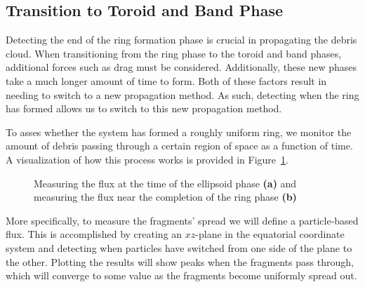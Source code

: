 \documentclass[a4paper, 12pt]{article}
\begin{document}
\subsection{Transition to Toroid and Band Phase}

Detecting the end of the ring formation phase is crucial in propagating the debris cloud. When transitioning from the ring phase to the toroid and band phases, additional forces such as drag must be considered. Additionally, these new phases take a much longer amount of time to form. Both of these factors result in needing to switch to a new propagation method. As such, detecting when the ring has formed allows us to switch to this new propagation method.

To asses whether the system has formed a roughly uniform ring, we monitor the amount of debris passing through a certain region of space as a function of time. A visualization of how this process works is provided in Figure~\ref{flux_diagrams}.

\begin{figure}[h]
	\begin{adjustbox}{max width=1\linewidth,center}
		\centering     %
	\end{adjustbox}
	\caption{Measuring the flux at the time of the ellipsoid phase \textbf{(a)} and measuring the flux near the completion of the ring phase \textbf{(b)} }
	\label{flux_diagrams}
\end{figure}

More specifically, to measure the fragments' spread we will define a particle-based flux. This is accomplished by creating an $xz$-plane in the equatorial coordinate system and detecting when particles have switched from one side of the plane to the other. Plotting the results will show peaks when the fragments pass through, which will converge to some value as the fragments become uniformly spread out.
\end{document}
